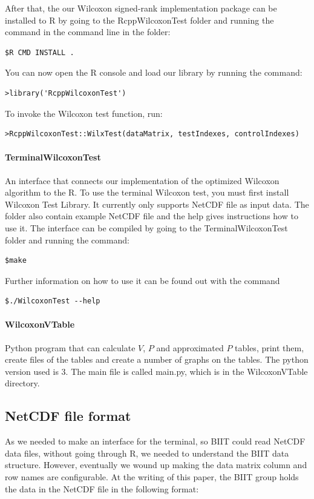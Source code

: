 \documentclass[12pt]{article}
\begin{document}
{After that, the our Wilcoxon signed-rank implementation package can be installed to R by going to the RcppWilcoxonTest folder and running the command in the command line in the folder:

\begin{lstlisting}
$R CMD INSTALL .
\end{lstlisting}

You can now open the R console and load our library by running the command:

\begin{lstlisting}
>library('RcppWilcoxonTest')
\end{lstlisting}

To invoke the Wilcoxon test function, run:

\begin{lstlisting}
>RcppWilcoxonTest::WilxTest(dataMatrix, testIndexes, controlIndexes)
\end{lstlisting}

\paragraph{TerminalWilcoxonTest}

An interface that connects our implementation of the optimized Wilcoxon algorithm to the R. To use the terminal Wilcoxon test, you must first install Wilcoxon Test Library. It currently only supports NetCDF file as input data. The folder also contain example NetCDF file and the help gives instructions how to use it. The interface can be compiled by going to the TerminalWilcoxonTest folder and running the command:
\begin{lstlisting}
$make
\end{lstlisting}

Further information on how to use it can be found out with the command
\begin{lstlisting}
$./WilcoxonTest --help
\end{lstlisting}

\paragraph{WilcoxonVTable}
Python program that can calculate $V$, $P$ and approximated $P$ tables, print them, create files of the tables and create a number of graphs on the tables. The python version used is 3. The main file is called main.py, which is in the WilcoxonVTable directory.

\subsection{NetCDF file format}
As we needed to make an interface for the terminal, so BIIT could read NetCDF data files, without going through R, we needed to understand the BIIT data structure. However, eventually we wound up making the data matrix column and row names are configurable.
At the writing of this paper, the BIIT group holds the data in the NetCDF file in the following format:

}
\end{document}
